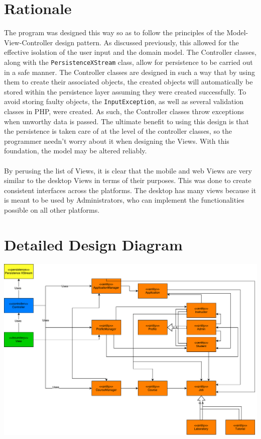 \documentclass[12pt]{report}
\begin{document}
\section{Rationale}
The program was designed this way so as to follow the principles of the Model-View-Controller design
pattern. As discussed previously, this allowed for the effective isolation of the user input and the
domain model. The Controller classes, along with the \texttt{PersistenceXStream} class, allow for
persistence to be carried out in a safe manner. The Controller classes are designed in such a way
that by using them to create their associated objects, the created objects will automatically be
stored within the persistence layer assuming they were created successfully. To avoid storing faulty
objects, the \texttt{InputException}, as well as several validation classes in PHP, were created. As
such, the Controller classes throw exceptions when unworthy data is passed. The ultimate benefit to
using this design is that the persistence is taken care of at the level of the controller classes,
so the programmer needn't worry about it when designing the Views. With this foundation, the model
may be altered reliably.\\\\
By perusing the list of Views, it is clear that the mobile and web Views are very similar to the
desktop Views in terms of their purposes. This was done to create consistent interfaces across the
platforms. The desktop has many views because it is meant to be used by Administrators, who can
implement the functionalities possible on all other platforms.
\section{Detailed Design Diagram}
\includegraphics[scale=0.6,angle=270]{DetailedDomainModelDiagram}
\end{document}
